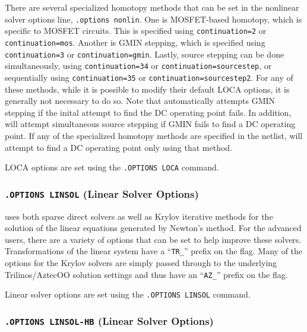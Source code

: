 There are several specialized homotopy methods that can be set in the nonlinear
solver options line, \texttt{.options nonlin}.  One is MOSFET-based homotopy, 
which is specific to MOSFET circuits.  This is specified using \texttt{continuation=2} or
\texttt{continuation=mos}.  Another is GMIN stepping, which is specified
using \texttt{continuation=3} or \texttt{continuation=gmin}.  Lastly, source stepping
can be done simultaneously, using \texttt{continuation=34} or \texttt{continuation=sourcestep},
or sequentially using \texttt{continuation=35} or \texttt{continuation=sourcestep2}.
For any of these methods, while it is possible to modify their default LOCA options, it is
generally not necessary to do so. Note that \Xyce{} automatically attempts GMIN
stepping if the inital attempt to find the DC operating point fails.  In addition,
\Xyce{} will attempt simultaneous source stepping if GMIN fails to find a DC operating
point.  If any of the specialized homotopy methods are specified in the netlist,
\Xyce{} will attempt to find a DC operating point only using that method. 

LOCA options are set using the \texttt{.OPTIONS LOCA} command.



\subsubsection{\texttt{.OPTIONS LINSOL} (Linear Solver Options)}

\Xyce{} uses both sparse direct
solvers as well as Krylov iterative
methods
for the solution of the linear equations generated by Newton's method.
For the advanced users, there are a variety of options that can be set
to help improve these solvers.  Transformations of the linear system
have a ``\verb+TR_+'' prefix on the flag.  Many of the options for the
Krylov solvers are simply passed through to the underlying
Trilinos/AztecOO
solution settings and thus have an ``\verb+AZ_+'' prefix on the flag.

Linear solver options are set using the \texttt{.OPTIONS LINSOL}
command.



\subsubsection{\texttt{.OPTIONS LINSOL-HB} (Linear Solver Options)}

